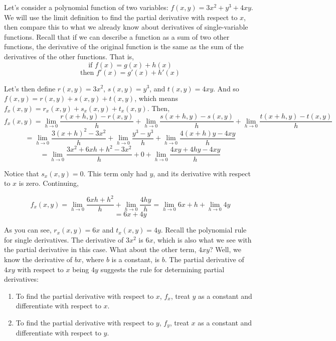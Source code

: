 Let's consider a polynomial function of two variables: $f(x, y) = 3x^2 + y^3 + 
4xy$. We will use the limit definition to find the partial derivative with 
respect to $x$, then compare this to what we already know about derivatives of 
single-variable functions. Recall that if we can describe a function as a sum of 
two other functions, the derivative of the original function is the same as the 
sum of the derivatives of the other functions. That is, 
$$\text{if } f(x) = g(x) + h(x)$$
$$\text{then } f'(x) = g'(x) + h'(x)$$

Let's then define $r(x, y) = 3x^2$, $s(x, y) = y^3$, and $t(x, y) = 4xy$. And 
so $f(x, y) = r(x, y) + s(x, y) + t(x, y)$, which means $f_x(x, y) = r_x(x, y) 
+ s_x(x, y) + t_x(x, y)$. Then,
$$f_x(x, y) = \lim_{h \to 0} \frac{r(x + h, y) - r(x, y)}{h} + \lim_{h \to 0} 
\frac{s(x + h, y) - s(x, y)}{h} + \lim_{h \to 0} \frac{t(x + h, y) - t(x, y)}{
h}$$
$$= \lim_{h \to 0} \frac{3(x + h)^2 - 3x^2}{h} + \lim_{h \to 0} \frac{y^3 - 
y^3}{h} + \lim_{h \to 0} \frac{4(x + h)y - 4xy}{h}$$
$$= \lim_{h \to 0} \frac{3x^2 + 6xh + h^2 - 3x^2}{h} + 0 + \lim_{h \to 0} 
\frac{4xy + 4hy - 4xy}{h}$$

Notice that $s_x(x, y) = 0$. This term only had $y$, and its derivative with 
respect to $x$ is zero. Continuing, 

$$f_x(x, y) = \lim_{h \to 0} \frac{6xh + h^2}{h} + \lim_{h \to 0} \frac{4hy}{h}
= \lim_{h \to 0} 6x + h + \lim_{h \to 0} 4y$$
$$= 6x + 4y$$

As you can see, $r_x(x, y) = 6x$ and $t_x(x, y) = 4y$. Recall the polynomial 
rule for single derivatives. The derivative of $3x^2$ is $6x$, which is also 
what we see with the partial derivative in this case. What about the other 
term, $4xy$? Well, we know the derivative of $bx$, where $b$ is a constant, is 
$b$. The partial derivative of $4xy$ with respect to $x$ being $4y$ suggests 
the rule for determining partial derivatives:

\begin{mdframed}[style = important, frametitle = {Rule for Finding Partial 
Derivatives of $f(x, y)$}]
\begin{enumerate}
    \item To find the partial derivative with respect to $x$, $f_x$, treat $y$ 
    as a constant and differentiate with respect to $x$.
    \item To find the partial derivative with respect to $y$, $f_y$, treat $x$ 
    as a constant and differentiate with respect to $y$.
\end{enumerate}
\end{mdframed}

